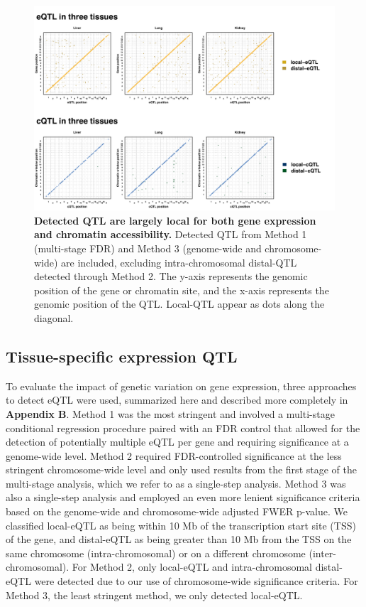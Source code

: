\begin{figure}[h]
\renewcommand{\familydefault}{\sfdefault}\normalfont
\centering
\includegraphics[width=\textwidth, trim={0in 0in 0in 0in}, clip]{figs/qtl_map_main.pdf}
\caption{\textbf{Detected QTL are largely local for both gene expression and chromatin accessibility.} Detected QTL from Method 1 (multi-stage FDR) and Method 3 (genome-wide and chromosome-wide) are included, excluding intra-chromosomal distal-QTL detected through Method 2. The y-axis represents the genomic position of the gene or chromatin site, and the x-axis represents the genomic position of the QTL. Local-QTL appear as dots along the diagonal.
\label{fig:grid_plot}}
\end{figure}

\subsection{Tissue-specific expression QTL}

To evaluate the impact of genetic variation on gene expression, three approaches to detect eQTL were used, summarized here and described more completely in \textbf{Appendix B}. Method 1 was the most stringent and involved a multi-stage conditional regression procedure paired with an FDR control that allowed for the detection of potentially multiple eQTL per gene and requiring significance at a genome-wide level. Method 2 required FDR-controlled significance at the less stringent chromosome-wide level and only used results from the first stage of the multi-stage analysis, which we refer to as a single-step analysis. Method 3 was also a single-step analysis and employed an even more lenient significance criteria based on the genome-wide and chromosome-wide adjusted FWER p-value. We classified local-eQTL as being within 10 Mb of the transcription start site (TSS) of the gene, and distal-eQTL as being greater than 10 Mb from the TSS on the same chromosome (intra-chromosomal) or on a different chromosome (inter-chromosomal). For Method 2, only local-eQTL and intra-chromosomal distal-eQTL were detected due to our use of chromosome-wide significance criteria. For Method 3, the least stringent method, we only detected local-eQTL.

